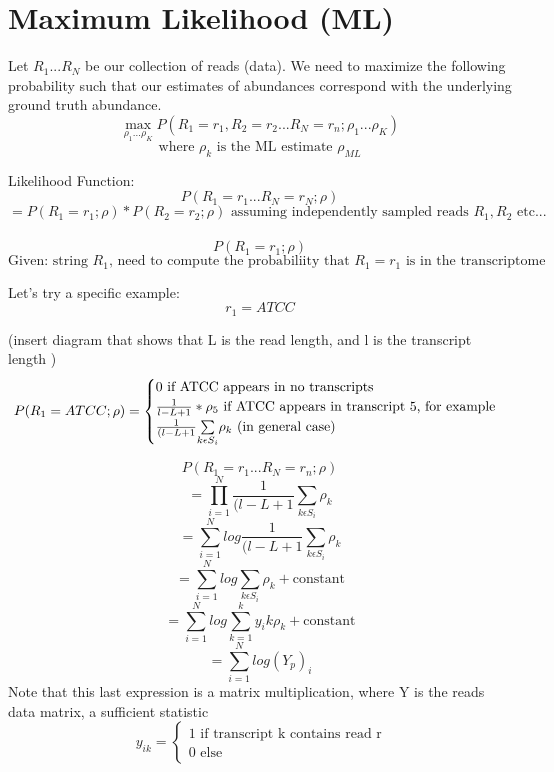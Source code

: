 \documentclass{article}
\begin{document}
\section{Maximum Likelihood (ML)}

Let $R_1 ...R_N$ be our collection of reads (data). We need to maximize the following probability such that our estimates of abundances correspond with the underlying ground truth abundance.
\[
  \max\limits_{\rho_1...\rho_K} P(R_1=r_1, R_2=r_2...R_N=r_n; \rho_1 ...\rho_K) \]
\[
  \text{where } \rho_k \text{ is the ML estimate } \rho_{ML}
\]

Likelihood Function: \\

\[P(R_1=r_1... R_N=r_N;\rho)\]
\[=P(R_1=r_1;\rho)*P(R_2=r_2;\rho) \text{ assuming independently sampled reads } R_1, R_2 \text{ etc...}\] \\
\[P(R_1=r_1;\rho)\]
\[\text{Given: string } R_1 \text{, need to compute the probabiliity that } R_1=r_1 \text{ is in the transcriptome}\]

\vspace{1mm}
Let's try a specific example:
\[r_1=ATCC\]

(insert diagram that shows that L is the read length, and l is the transcript length )
\begin{equation}
\  P(R_1 = ATCC;\rho)=
  \begin{cases}
    0 \text{ if ATCC appears in no transcripts}\\
    \frac{1}{l-L+1} * \rho_5 \text{  if ATCC appears in transcript 5, for example} \\
    \frac{1}{(l-L+1}
    $$\sum\limits_{k \epsilon S_i}^{}$$ \rho_k \text{  (in general case)}\\
  \end{cases}
\end{equation}

\[  P(R_1=r_1...R_N=r_n;\rho)\]
\[  = \prod\limits_{i=1}^N \frac{1}{(l-L+1} \sum\limits_{k \epsilon S_i}^{} \rho_k \]
\[  = \sum\limits_{i=1}^N log \frac{1}{(l-L+1} \sum\limits_{k \epsilon S_i}^{} \rho_k \]
\[  = \sum\limits_{i=1}^N log \sum\limits_{k \epsilon S_i}^{} \rho_k + \text{constant}\]
\[  = \sum\limits_{i=1}^N log \sum\limits_{k=1}^{k} y_ik \rho_k + \text{constant}\]
\[  = \sum\limits_{i=1}^N log(Y_p)_i  \]
Note that this last expression is a matrix multiplication, where Y is the reads data matrix, a sufficient statistic
\begin{equation}
\  y_{ik}=
  \begin{cases}
    1 \text{ if transcript k contains read r} \\
    0 \text{ else}
  \end{cases}
\end{equation}
\end{document}
